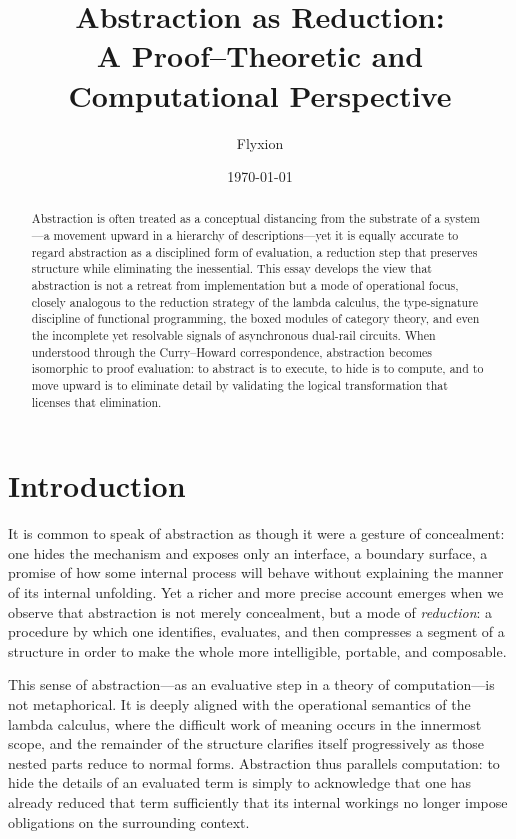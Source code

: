 \documentclass[11pt,letterpaper]{article}
\title{\textbf{Abstraction as Reduction:}\\
A Proof--Theoretic and Computational Perspective}
\author{Flyxion}
\date{\today}
\begin{document}
\maketitle

\begin{abstract}
Abstraction is often treated as a conceptual distancing from the substrate of a system---a movement upward in a hierarchy of descriptions---yet it is equally accurate to regard abstraction as a disciplined form of evaluation, a reduction step that preserves structure while eliminating the inessential. This essay develops the view that abstraction is not a retreat from implementation but a mode of operational focus, closely analogous to the reduction strategy of the lambda calculus, the type-signature discipline of functional programming, the boxed modules of category theory, and even the incomplete yet resolvable signals of asynchronous dual-rail circuits. When understood through the Curry--Howard correspondence, abstraction becomes isomorphic to proof evaluation: to abstract is to execute, to hide is to compute, and to move upward is to eliminate detail by validating the logical transformation that licenses that elimination. 
\end{abstract}

\section{Introduction}

It is common to speak of abstraction as though it were a gesture of concealment: one hides the mechanism and exposes only an interface, a boundary surface, a promise of how some internal process will behave without explaining the manner of its internal unfolding. Yet a richer and more precise account emerges when we observe that abstraction is not merely concealment, but a mode of \emph{reduction}: a procedure by which one identifies, evaluates, and then compresses a segment of a structure in order to make the whole more intelligible, portable, and composable. 

This sense of abstraction---as an evaluative step in a theory of computation---is not metaphorical. It is deeply aligned with the operational semantics of the lambda calculus, where the difficult work of meaning occurs in the innermost scope, and the remainder of the structure clarifies itself progressively as those nested parts reduce to normal forms. Abstraction thus parallels computation: to hide the details of an evaluated term is simply to acknowledge that one has already reduced that term sufficiently that its internal workings no longer impose obligations on the surrounding context.
\end{document}

